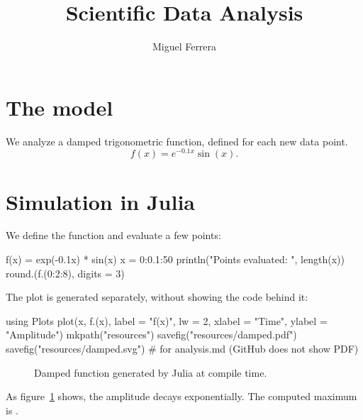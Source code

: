 \documentclass[a4paper]{article}
\title{Scientific Data Analysis}
\author{Miguel Ferrera}
\begin{document}
\maketitle

\section{The model}

We analyze a damped trigonometric function, defined for each new data point.
\begin{equation}
  f(x) = e^{-0.1x} \sin(x).
\end{equation}

\section{Simulation in Julia}

We define the function and evaluate a few points:

\begin{juliacode}
f(x) = exp(-0.1x) * sin(x)
x = 0:0.1:50
println("Points evaluated: ", length(x))
round.(f.(0:2:8), digits = 3)
\end{juliacode}

The plot is generated separately, without showing the code behind it:

\begin{juliarun}
using Plots
plot(x, f.(x), label = "f(x)", lw = 2, xlabel = "Time", ylabel = "Amplitude")
mkpath("resources")
savefig("resources/damped.pdf")
savefig("resources/damped.svg") # for analysis.md (GitHub does not show PDF)
\end{juliarun}

\begin{figure}[htbp]
  \centering
  \caption{Damped function generated by Julia at compile time.}%
  \label{fig:damped}
\end{figure}

As figure~\ref{fig:damped} shows, the amplitude decays exponentially.
The computed maximum is .
\end{document}

